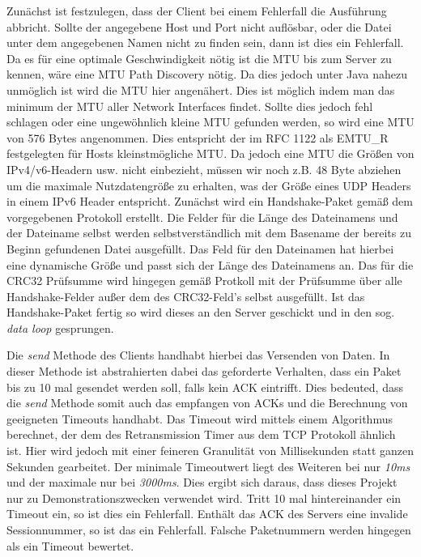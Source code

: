 Zunächst ist festzulegen, dass der Client bei einem Fehlerfall die Ausführung abbricht.
Sollte der angegebene Host und Port nicht auflösbar, oder die Datei unter dem angegebenen Namen nicht zu finden sein, dann ist dies ein Fehlerfall.
Da es für eine optimale Geschwindigkeit nötig ist die MTU bis zum Server zu kennen, wäre eine MTU Path Discovery nötig.
Da dies jedoch unter Java nahezu unmöglich ist wird die MTU hier angenähert.
Dies ist möglich indem man das minimum der MTU aller Network Interfaces findet.
Sollte dies jedoch fehl schlagen oder eine ungewöhnlich kleine MTU gefunden werden, so wird eine MTU von 576 Bytes angenommen.
Dies entspricht der im RFC 1122 als EMTU\_R festgelegten für Hosts kleinstmögliche MTU.
Da jedoch eine MTU die Größen von IPv4/v6-Headern usw. nicht einbezieht, müssen wir noch z.B. 48 Byte abziehen um die maximale Nutzdatengröße zu erhalten, was der Größe eines UDP Headers in einem IPv6 Header entspricht.
Zunächst wird ein Handshake-Paket gemäß dem vorgegebenen Protokoll erstellt.
Die Felder für die Länge des Dateinamens und der Dateiname selbst werden selbstverständlich mit dem Basename der bereits zu Beginn gefundenen Datei ausgefüllt.
Das Feld für den Dateinamen hat hierbei eine dynamische Größe und passt sich der Länge des Dateinamens an.
Das für die CRC32 Prüfsumme wird hingegen gemäß Protkoll mit der Prüfsumme über alle Handshake-Felder außer dem des CRC32-Feld's selbst ausgefüllt.
Ist das Handshake-Paket fertig so wird dieses an den Server geschickt und in den sog. \textit{data loop} gesprungen. \newline

Die \textit{send} Methode des Clients handhabt hierbei das Versenden von Daten.
In dieser Methode ist abstrahierten dabei das geforderte Verhalten, dass ein Paket bis zu 10 mal gesendet werden soll, falls kein ACK eintrifft.
Dies bedeuted, dass die \textit{send} Methode somit auch das empfangen von ACKs und die Berechnung von geeigneten Timeouts handhabt.
Das Timeout wird mittels einem Algorithmus berechnet, der dem des Retransmission Timer aus dem TCP Protokoll ähnlich ist.
Hier wird jedoch mit einer feineren Granulität von Millisekunden statt ganzen Sekunden gearbeitet.
Der minimale Timeoutwert liegt des Weiteren bei nur \textit{10ms} und der maximale nur bei \textit{3000ms}.
Dies ergibt sich daraus, dass dieses Projekt nur zu Demonstrationszwecken verwendet wird.
Tritt 10 mal hintereinander ein Timeout ein, so ist dies ein Fehlerfall.
Enthält das ACK des Servers eine invalide Sessionnummer, so ist das ein Fehlerfall.
Falsche Paketnummern werden hingegen als ein Timeout bewertet. \newline

